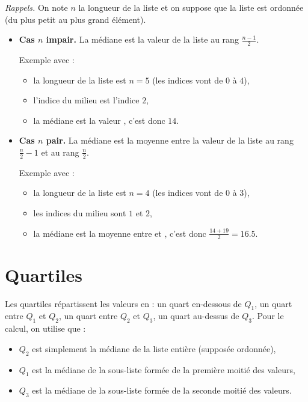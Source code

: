 \documentclass[11pt,class=report,crop=false]{standalone}
\begin{document}
  \emph{Rappels.} On note $n$ la longueur de la liste et on suppose que la liste est ordonnée (du plus petit au plus grand élément).
  \begin{itemize}
    \item \textbf{Cas $n$ impair.} La médiane est la valeur de la liste au rang $\frac{n-1}{2}$.    
    
    Exemple avec  :
    \begin{itemize}
      \item la longueur de la liste est $n=5$ (les indices vont de $0$ à $4$),
      \item l'indice du milieu est l'indice $2$,
      \item la médiane est la valeur , c'est donc $14$.
    \end{itemize}
    
    \item \textbf{Cas $n$ pair.} La médiane est la moyenne entre la valeur de la liste au rang $\frac{n}{2}-1$ et au rang $\frac{n}{2}$.
    
    Exemple avec  :
    \begin{itemize}
      \item la longueur de la liste est $n=4$ (les indices vont de $0$ à $3$),
      \item les indices du milieu sont $1$ et $2$,
      \item la médiane est la moyenne entre  et , c'est donc $\frac{14+19}{2} = 16.5$.
    \end{itemize}    
    \end{itemize} 


\newpage

\section*{Quartiles}

Les quartiles répartissent les valeurs en : un quart en-dessous de $Q_1$, un quart entre $Q_1$ et $Q_2$, un quart entre $Q_2$ et $Q_3$, un quart au-dessus de $Q_3$.
    Pour le calcul, on utilise que :
    \begin{itemize}
      \item $Q_2$ est simplement la médiane de la liste entière (supposée ordonnée),
      \item $Q_1$ est la médiane de la sous-liste formée de la première moitié des valeurs,
      \item $Q_3$ est la médiane de la sous-liste formée de la seconde moitié des valeurs. 
    \end{itemize}           
\end{document}
